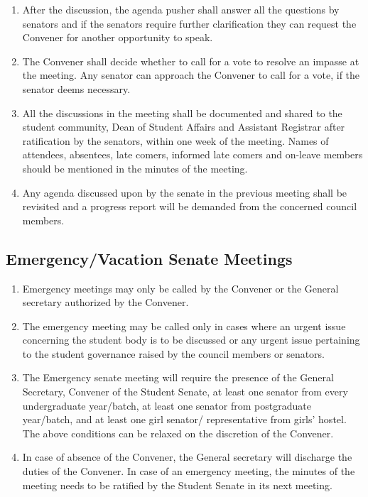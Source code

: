 \documentclass[12pt]{article}
\begin{document}
\begin{enumerate}
    \item After the discussion, the agenda pusher shall answer all the questions by senators and if the senators require further clarification they can request the Convener for another opportunity to speak.
    \item The Convener shall decide whether to call for a vote to resolve an impasse at the meeting. Any senator can approach the Convener to call for a vote, if the senator deems necessary.
    \item All the discussions in the meeting shall be documented and shared to the student community, Dean of Student Affairs and Assistant Registrar after ratification by the senators, within one week of the meeting. Names of attendees, absentees, late comers, informed late comers and on-leave members should be mentioned in the minutes of the meeting.
    \item Any agenda discussed upon by the senate in the previous meeting shall be revisited and a progress report will be demanded from the concerned council members.
\end{enumerate}

\subsection{Emergency/Vacation Senate Meetings} \label{emergency}
\begin{enumerate}
    \item Emergency meetings may only be called by the Convener or the General secretary authorized by the Convener.
    \item The emergency meeting may be called only in cases where an urgent issue concerning the student body is to be discussed or any urgent issue pertaining to the student governance raised by the council members or senators.
    \item The Emergency senate meeting will require the presence of the General Secretary, Convener of the Student Senate, at least one senator from every undergraduate year/batch, at least one senator from postgraduate year/batch, and at least one girl senator/ representative from girls’ hostel. The above conditions can be relaxed on the discretion of the Convener.
    \item In case of absence of the Convener, the General secretary will discharge the duties of the Convener. In case of an emergency meeting, the minutes of the meeting needs to be ratified by the Student Senate in its next meeting.
\end{enumerate}
\end{document}
